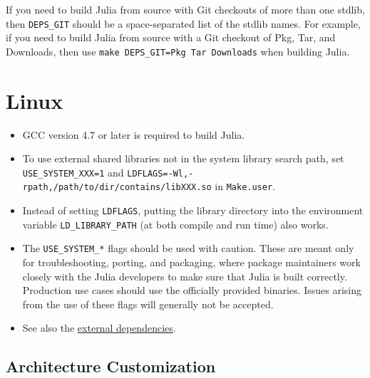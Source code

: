 If you need to build Julia from source with Git checkouts of more than one stdlib, then \texttt{DEPS\_GIT} should be a space-separated list of the stdlib names. For example, if you need to build Julia from source with a Git checkout of Pkg, Tar, and Downloads, then use \texttt{make DEPS\_GIT={\textquotesingle}Pkg Tar Downloads{\textquotesingle}} when building Julia.



\hypertarget{17775253147870272772}{}


\section{Linux}



\begin{itemize}
\item GCC version 4.7 or later is required to build Julia.


\item To use external shared libraries not in the system library search path, set \texttt{USE\_SYSTEM\_XXX=1} and \texttt{LDFLAGS=-Wl,-rpath,/path/to/dir/contains/libXXX.so} in \texttt{Make.user}.


\item Instead of setting \texttt{LDFLAGS}, putting the library directory into the environment variable \texttt{LD\_LIBRARY\_PATH} (at both compile and run time) also works.


\item The \texttt{USE\_SYSTEM\_*} flags should be used with caution. These are meant only for troubleshooting, porting, and packaging, where package maintainers work closely with the Julia developers to make sure that Julia is built correctly. Production use cases should use the officially provided binaries. Issues arising from the use of these flags will generally not be accepted.


\item See also the \hyperlink{4364585969841474105}{external dependencies}.

\end{itemize}


\hypertarget{7684914430795515278}{}


\subsection{Architecture Customization}



